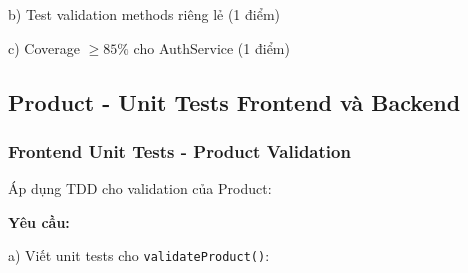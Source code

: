 \documentclass[a4paper,12pt]{article}
\begin{document}
b) Test validation methods riêng lẻ (1 điểm)

c) Coverage $\geq 85\%$ cho AuthService (1 điểm)


\subsection{Product - Unit Tests Frontend và Backend}

\subsubsection{Frontend Unit Tests - Product Validation}

Áp dụng TDD cho validation của Product:

\textbf{Yêu cầu:}

a) Viết unit tests cho \texttt{validateProduct()}:
\end{document}
